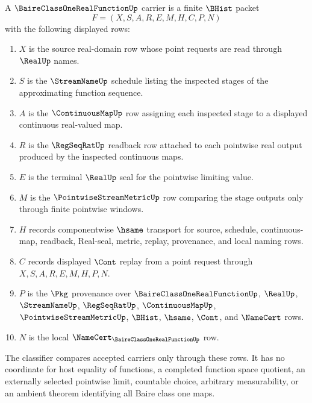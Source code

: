 \begin{definition}
\label{def:baire-class-one-real-function-carrier}
A $\BaireClassOneRealFunctionUp$ carrier is a finite $\BHist$ packet
$$
F=(X,S,A,R,E,M,H,C,P,N)
$$
with the following displayed rows:
\begin{enumerate}
\item $X$ is the source real-domain row whose point requests are read through $\RealUp$ names.
\item $S$ is the $\StreamNameUp$ schedule listing the inspected stages of the approximating function sequence.
\item $A$ is the $\ContinuousMapUp$ row assigning each inspected stage to a displayed continuous real-valued map.
\item $R$ is the $\RegSeqRatUp$ readback row attached to each pointwise real output produced by the inspected continuous maps.
\item $E$ is the terminal $\RealUp$ seal for the pointwise limiting value.
\item $M$ is the $\PointwiseStreamMetricUp$ row comparing the stage outputs only through finite pointwise windows.
\item $H$ records componentwise $\hsame$ transport for source, schedule, continuous-map, readback, Real-seal, metric, replay, provenance, and local naming rows.
\item $C$ records displayed $\Cont$ replay from a point request through $X,S,A,R,E,M,H,P,N$.
\item $P$ is the $\Pkg$ provenance over $\BaireClassOneRealFunctionUp$, $\RealUp$, $\StreamNameUp$, $\RegSeqRatUp$, $\ContinuousMapUp$, $\PointwiseStreamMetricUp$, $\BHist$, $\hsame$, $\Cont$, and $\NameCert$ rows.
\item $N$ is the local $\NameCert_{\BaireClassOneRealFunctionUp}$ row.
\end{enumerate}
The classifier compares accepted carriers only through these rows. It has no coordinate for host equality of functions, a completed function space quotient, an externally selected pointwise limit, countable choice, arbitrary measurability, or an ambient theorem identifying all Baire class one maps.
\end{definition}

